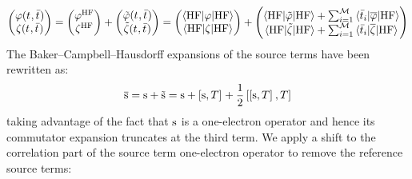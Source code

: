 \begin{equation}
  \begin{pmatrix}
   \varphi(t_{}, \bar{t}_{}) \\
   \zeta(t_{}, \bar{t}_{})
  \end{pmatrix}
  =
  \begin{pmatrix}
   \varphi^\mathrm{HF} \\
   \zeta^\mathrm{HF}
  \end{pmatrix}
  +
  \begin{pmatrix}
    \tilde{\varphi}(t_{}, \bar{t}_{}) \\
   \tilde{\zeta}(t_{}, \bar{t}_{})
  \end{pmatrix}
  =
  \begin{pmatrix}
  \braket{\mathrm{HF} | \varphi  | \mathrm{HF}} \\
  \braket{\mathrm{HF} | \zeta | \mathrm{HF}}
  \end{pmatrix}
  +
  \begin{pmatrix}
   \braket{\mathrm{HF} | \tilde{\varphi} | \mathrm{HF}}
  + \sum_{i=1}^{\mathcal{M}}\braket{\bar{t}_{i} | \overline{\varphi} | \mathrm{HF}} \\
   \braket{\mathrm{HF} | \tilde{\zeta} | \mathrm{HF}}
  + \sum_{i=1}^{\mathcal{M}}\braket{\bar{t}_{i} | \overline{\zeta} | \mathrm{HF}}
  \end{pmatrix}
\end{equation}
The Baker--Campbell--Hausdorff expansions of the source terms have been
rewritten as:
\begin{equation}
  \overline{\mathrm{s}} = \mathrm{s} + \tilde{\mathrm{s}} = \mathrm{s} + \left[ \mathrm{s}, T \right]^{}
  + \frac{1}{2}\left[ \left[ \mathrm{s}, T \right]^{}, T \right]^{}
\end{equation}
taking advantage of the fact that $\mathrm{s}$ is a one-electron operator and
hence its commutator expansion truncates at the third term.
We apply a shift to the correlation part of the source term
one-electron operator to remove the reference source terms:
